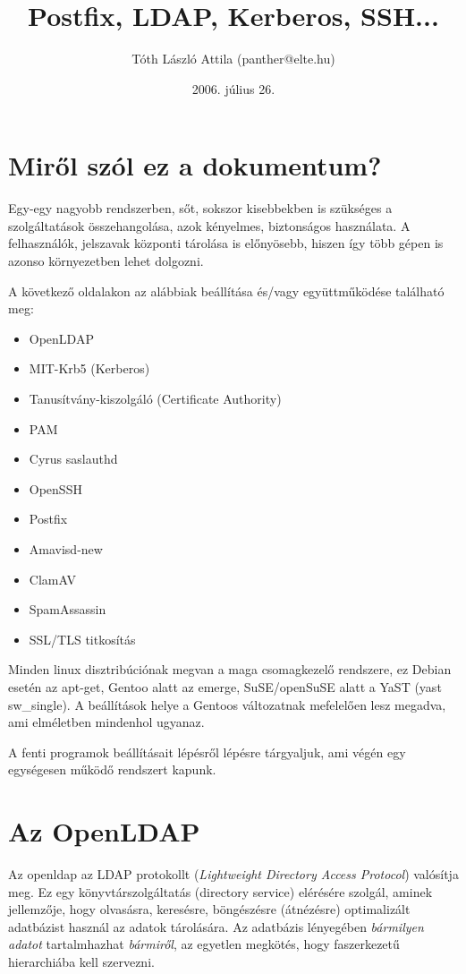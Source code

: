 \documentclass[fleqn,10pt,a4paper,titlepage]{article}
\title{Postfix, LDAP, Kerberos, SSH...}
\author{Tóth László Attila (panther@elte.hu)}
\date{2006. július 26.}
\newcommand{\mktoc}{
  \pagenumbering{roman}
  \setcounter{page}{1}
  \lhead{\textbf{\thepage}}
  \cfoot{}
  \tableofcontents
  \newpage
  \lhead{\textbf{\thepage}}
  \pagenumbering{arabic}
  \setcounter{page}{1}
}
\begin{document}
  \maketitle
  \mktoc
  \newpage
  \section{Miről szól ez a dokumentum?}
  Egy-egy nagyobb rendszerben, sőt, sokszor kisebbekben is szükséges a szolgáltatások összehangolása, azok kényelmes,
  biztonságos használata. A felhasználók, jelszavak központi tárolása is előnyösebb, hiszen így több gépen is azonso
  környezetben lehet dolgozni.

  A következő oldalakon az alábbiak beállítása és/vagy együttműködése található meg:
  \begin{itemize}
  \item OpenLDAP
  \item MIT-Krb5 (Kerberos)
  \item Tanusítvány-kiszolgáló (Certificate Authority)
  \item PAM
  \item Cyrus saslauthd
  \item OpenSSH
  \item Postfix
  \item Amavisd-new
  \item ClamAV
  \item SpamAssassin
  \item SSL/TLS titkosítás
  \end{itemize}
  
  Minden linux disztribúciónak megvan a maga csomagkezelő rendszere, ez Debian esetén az apt-get, Gentoo alatt az
  emerge, SuSE/openSuSE alatt a YaST (yast sw\_single). A beállítások helye a Gentoos változatnak mefelelően lesz
  megadva, ami elméletben mindenhol ugyanaz.

  A fenti programok beállításait lépésről lépésre tárgyaljuk, ami végén egy egységesen működő rendszert kapunk.
  
  \newpage
  \section{Az OpenLDAP}
  Az openldap az LDAP protokollt ({\em Lightweight Directory Access Protocol}) valósítja meg. Ez egy könyvtárszolgáltatás
  (directory service) elérésére szolgál, aminek jellemzője, hogy olvasásra, keresésre, böngészésre (átnézésre)
  optimalizált adatbázist használ az adatok tárolására. Az adatbázis lényegében \emph{bármilyen adatot} tartalmhazhat
  \emph{bármiről}, az egyetlen megkötés, hogy faszerkezetű hierarchiába kell szervezni.
\end{document}
